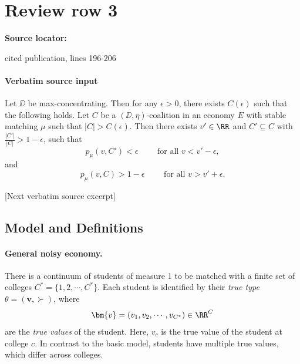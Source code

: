 \documentclass[10pt]{article}
\begin{document}
\section*{Review row 3}
\textbf{Source locator:} {\footnotesize\raggedright cited publication, lines 196-\allowbreak{}206\par}
\paragraph{Verbatim source input}
\begin{ReviewVerbatim}
\begin{theorem}\label{thm:attenuating-extended}
    Let $\DD$ be max-concentrating. Then for any $\epsilon > 0$, there exists $C(\epsilon)$ such that the following holds.
    Let $C$ be a $(\DD, \eta)$-coalition in an economy $E$ with stable matching $\mu$ such that $|C|>C(\epsilon)$. Then there exists $v'\in \RR$ and $C'\subseteq C$ with $\frac{|C'|}{|C|} > 1 - \epsilon$, such that
    \begin{equation}
        p_\mu(v, C') < \epsilon \qquad\text{ for all $v<v'-\epsilon$},
    \end{equation}
    and
    \begin{equation}
        p_\mu(v, C) > 1 - \epsilon \qquad\text{ for all $v>v'+\epsilon$}.
    \end{equation}
\end{theorem}

[Next verbatim source excerpt]

\subsection{Model and Definitions}

\paragraph{General noisy economy.}
There is a continuum of students of measure 1 to be matched with a finite set of colleges $C^* = \{1, 2, \cdots, C^*\}.$ Each student is identified by their \textit{true type} $\theta = (\bm{v}, \succ)$, where
\begin{equation}
    \bm{v} = (v_1, v_2, \cdots, v_{C^*}) \in \RR^C
\end{equation}
are the \textit{true values} of the student. Here, $v_c$ is the true value of the student at college $c$. In contrast to the basic model, students have multiple true values, which differ across colleges.


\end{ReviewVerbatim}
\end{document}
